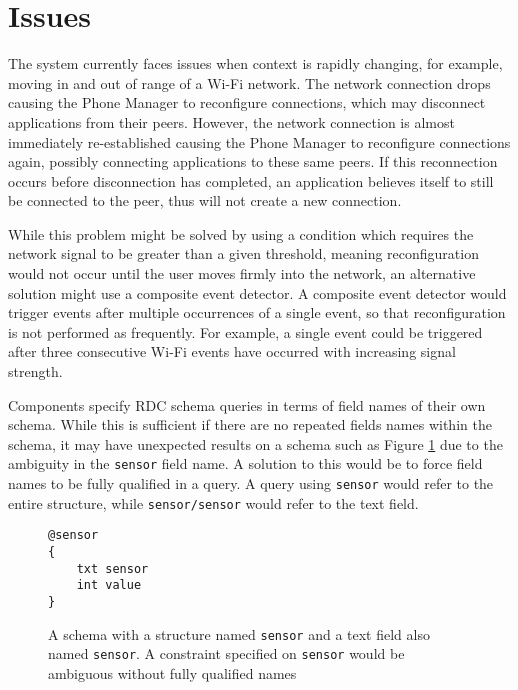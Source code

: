 \documentclass[12pt,twoside,notitlepage]{report}
\begin{document}
\section{Issues}
The system currently faces issues when context is rapidly changing, for example, moving in and out of range of a Wi-Fi network. 
The network connection drops causing the Phone Manager to reconfigure connections, which may disconnect applications from their peers.
However, the network connection is almost immediately re-established causing the Phone Manager to reconfigure connections again, possibly connecting applications to these same peers. 
If this reconnection occurs before disconnection has completed, an application believes itself to still be connected to the peer, thus will not create a new connection.

While this problem might be solved by using a condition which requires the network signal to be greater than a given threshold, meaning reconfiguration would not occur until the user moves firmly into the network, an alternative solution might use a composite event detector. 
A composite event detector would trigger events after multiple occurrences of a single event, so that reconfiguration is not performed as frequently. 
For example, a single event could be triggered after three consecutive Wi-Fi events have occurred with increasing signal strength. 

Components specify RDC schema queries in terms of field names of their own schema.
While this is sufficient if there are no repeated fields names within the schema, it may have unexpected results on a schema such as Figure \ref{fig:repeatednameschema} due to the ambiguity in the {\tt sensor} field name. 
A solution to this would be to force field names to be fully qualified in a query. 
A query using {\tt sensor} would refer to the entire structure, while {\tt sensor/sensor} would refer to the text field.

\begin{figure}[h]
\begin{lstlisting}
@sensor
{
	txt sensor
	int value
}
\end{lstlisting}
\caption[Ambiguously Named Schema]{A schema with a structure named {\tt sensor} and a text field also named {\tt sensor}. A constraint specified on {\tt sensor} would be ambiguous without fully qualified names}
\label{fig:repeatednameschema}
\end{figure}
\end{document}
